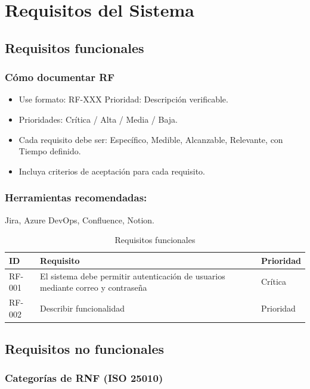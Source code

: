 \documentclass[a4paper,11pt,spanish]{article}
\begin{document}
\newpage

\section{Requisitos del Sistema}

\subsection{Requisitos funcionales}

\subsubsection*{Cómo documentar RF}

\begin{itemize}
    \item Use formato: RF-XXX Prioridad: Descripción verificable.
    \item Prioridades: Crítica / Alta / Media / Baja.
    \item Cada requisito debe ser: Específico, Medible, Alcanzable, Relevante, con Tiempo definido.
    \item Incluya criterios de aceptación para cada requisito.
\end{itemize}

\subsubsection*{Herramientas recomendadas:} Jira, Azure DevOps, Confluence, Notion.

\begin{table}[H]
\centering
\caption{Requisitos funcionales}
\label{tab:req-funcionales}
\begin{tabular}{@{}lll@{}}
\toprule
\textbf{ID} & \textbf{Requisito} & \textbf{Prioridad} \\
\midrule
RF-001 & El sistema debe permitir autenticación de usuarios mediante correo y contraseña & Crítica \\
RF-002 & Describir funcionalidad & Prioridad \\
\bottomrule
\end{tabular}
\end{table}

\subsection{Requisitos no funcionales}

\subsubsection*{Categorías de RNF (ISO 25010)}
\end{document}

